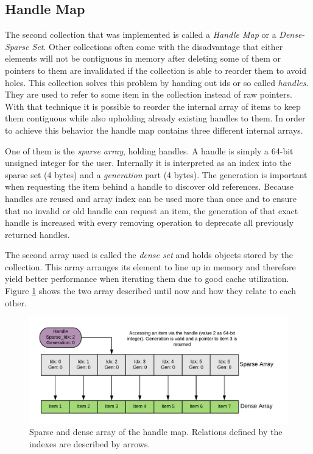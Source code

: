 \subsection{Handle Map} \label{handle_map_impl}

The second collection that was implemented is called a \textit{Handle Map} or a \textit{Dense-Sparse Set}. Other collections often come with the disadvantage that either elements will not be contiguous in memory after deleting some of them or pointers to them are invalidated if the collection is able to reorder them to avoid holes. This collection solves this problem by handing out ids or so called \textit{handles}. They are used to refer to some item in the collection instead of raw pointers. With that technique it is possible to reorder the internal array of items to keep them contiguous while also upholding already existing handles to them. In order to achieve this behavior the handle map contains three different internal arrays. 

One of them is the \textit{sparse array}, holding handles. A handle is simply a 64-bit unsigned integer for the user. Internally it is interpreted as an index into the sparse set (4 bytes) and a \textit{generation} part (4 bytes). The generation is important when requesting the item behind a handle to discover old references. Because handles are reused and array index can be used more than once and to ensure that no invalid or old handle can request an item, the generation of that exact handle is increased with every removing operation to deprecate all previously returned handles. 

The second array used is called the \textit{dense set} and holds objects stored by the collection. This array arranges its element to line up in memory and therefore yield better performance when iterating them due to good cache utilization. Figure \ref{fig:handle_map} shows the two array described until now and how they relate to each other.

\begin{figure}[h!]
	\centering \includegraphics[width=\linewidth]{PICs/handle_map.png}
	\caption{Sparse and dense array of the handle map. Relations defined by the indexes are described by arrows.}
	\label{fig:handle_map}
\end{figure}

